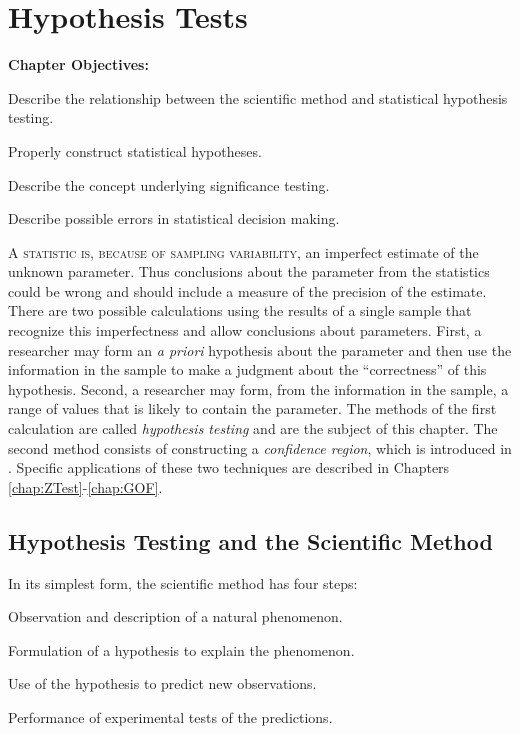 \documentclass[10pt,openany]{book}\usepackage[]{graphicx}\usepackage[]{color}
\begin{document}
\chapter{Hypothesis Tests} \label{chap:HypothesisTests}
\begin{ChapObj}{\boxwidth}
  \textbf{Chapter Objectives:}
  \begin{Enumerate}
    \item Describe the relationship between the scientific method and statistical hypothesis testing.
    \item Properly construct statistical hypotheses.
    \item Describe the concept underlying significance testing.
    \item Describe possible errors in statistical decision making.
  \end{Enumerate}
\end{ChapObj}

\minitoc
\newpage

\lettrine{A}{ statistic is, because of sampling variability,} an imperfect estimate of the unknown parameter.  Thus conclusions about the parameter from the statistics could be wrong and should include a measure of the precision of the estimate.  There are two possible calculations using the results of a single sample that recognize this imperfectness and allow conclusions about parameters.  First, a researcher may form an \emph{a priori} hypothesis about the parameter and then use the information in the sample to make a judgment about the ``correctness'' of this hypothesis.  Second, a researcher may form, from the information in the sample, a range of values that is likely to contain the parameter.  The methods of the first calculation are called \emph{hypothesis testing} and are the subject of this chapter. The second method consists of constructing a \emph{confidence region}, which is introduced in . Specific applications of these two techniques are described in Chapters \ref{chap:ZTest}-\ref{chap:GOF}.


\section{Hypothesis Testing and the Scientific Method} \label{sect:SciMethod}
In its simplest form, the scientific method has four steps:

\begin{Enumerate}
  \item Observation and description of a natural phenomenon.
  \item Formulation of a hypothesis to explain the phenomenon.
  \item Use of the hypothesis to predict new observations.
  \item Performance of experimental tests of the predictions.
\end{Enumerate}
\end{document}
